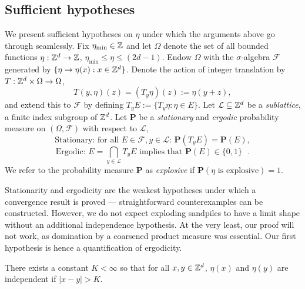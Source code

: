\documentclass[12pt]{amsart}
\begin{document}
\subsection{Sufficient hypotheses} \label{sec:sufficient_hypotheses}
We present sufficient hypotheses on $\eta$ under which the arguments above go through seamlessly. 
Fix $\eta_{\min} \in \mathbb{Z}$ and let $\Omega$ denote the set of all bounded functions $\eta: \mathbb{Z}^d \to \mathbb{Z}$, $\eta_{\min} \leq \eta \leq (2 d- 1)$.
Endow $\Omega$ with the $\sigma$-algebra $\mathcal{F}$ generated by $\{ \eta \to \eta(x) : x \in \mathbb{Z}^d\}$. Denote the action of integer translation by $T: \mathbb{Z}^d \times \Omega \to \Omega$, 
\[
T(y, \eta)(z) = (T_y \eta)(z) := \eta(y + z),
\]
and extend this to $\mathcal{F}$ by defining  $T_y E := \{ T_y \eta : \eta \in E\}$.
Let $\mathcal{L} \subseteq \mathbb{Z}^d$ be a {\it sublattice}, a finite index subgroup of $\mathbb{Z}^d$.
Let $\mathbf{P}$ be a {\it stationary} and {\it ergodic} probability measure on $(\Omega, \mathcal{F})$
with respect to $\mathcal{L}$,
\begin{equation}
\mbox{Stationary: for all $E \in \mathcal{F}, y \in \mathcal{L}$: } \mathbf{P}(T_y E) = \mathbf{P}(E),
\end{equation}
\begin{equation}
\mbox{Ergodic:  $E = \bigcap_{y \in \mathcal{L}} T_y E$ implies that $\mathbf{P}(E) \in \{0,1\}$ }.
\end{equation}
We refer to the probability measure $\mathbf{P}$ as {\it explosive} if $\mathbf{P}(\eta \mbox{ is explosive}) = 1$.

Stationarity and ergodicity are the weakest hypotheses under which a convergence result is proved --- straightforward 
counterexamples can be constructed.
However, we do not expect exploding sandpiles to have a limit shape without an additional independence hypothesis. At the very least, 
our proof will not work, as domination by a coarsened product measure was essential. Our first hypothesis is hence a quantification of ergodicity. 

\begin{hyp} \label{hyp:finite_range_of_dependence}
	There exists a constant $K < \infty$ so that for all $x,y \in \mathbb{Z}^d$, $\eta(x)$ and $\eta(y)$ are independent if $|x-y| > K$. 
\end{hyp}
\end{document}
